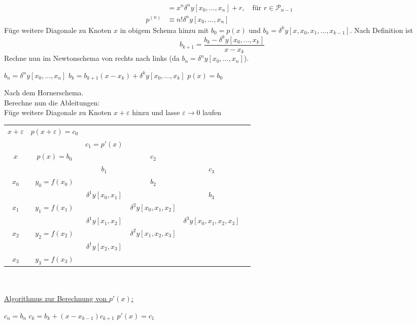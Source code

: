 \documentclass[12pt]{article}
\theoremstyle{break}
\begin{document}
\begin{description}
\begin{align*}
    &= x^n \delta^ny[x_0,..., x_n] + r, \quad \text{für }r \in \mathcal{P}_{n-1} &\\
    p^{(n)} &\equiv n! \delta^ny[x_0,..., x_n]
  \end{align*}
  Füge weitere Diagonale zu Knoten $x$ in obigem Schema hinzu mit $b_0 = p(x)$ und $b_k = \delta^k y[x, x_0, x_1, ..., x_{k-1}]$. Nach Definition ist 
  $$b_{k+1} = \frac{b_k - \delta^ky[x_0,..., x_k]}{x-x_k}$$
  Rechne nun im Newtonschema von rechts nach links (da $b_n = \delta^ny[x_0,..., x_n]$).
  \begin{algorithmic}
  \STATE $b_n = \delta^ny[x_0,...,x_n]$ 
    \STATE $b_k = b_{k+1} (x-x_k) + \delta^ky[x_0,...,x_k]$
  \ENDFOR
  \STATE $p(x) = b_0$
  \end{algorithmic}
  Nach dem Hornerschema.\\
  Berechne nun die Ableitungen: \\
  Füge weitere Diagonale zu Knoten $x+ \varepsilon$ hinzu und lasse $\varepsilon \rightarrow 0$ laufen \\
  \begin{tabular}{cccccc}
    $x+ \varepsilon$ & $p(x + \varepsilon) = c_0$ \\
    && $c_1 = p'(x)$ \\
    $x$ & $p(x) = b_0$ && $c_2$\\
    &&$b_1$&&$c_3$\\
	$x_0$ & $y_0 = f(x_0)$ && $b_2$&\rotatebox[origin=c]{90}{$=$}\\
	 & & $\delta^1y[x_0, x_1]$&& $b_3$\\
	$x_1$ & $y_1 = f(x_1)$ & &$\delta^2y[x_0, x_1, x_2]$  &\rotatebox[origin=c]{90}{$=$}\\
	 & & $\delta^1y[x_1, x_2]$ & & $\delta^3y[x_0, x_1, x_2, x_3]$\\
	$x_2$ & $y_2 = f(x_2)$ & & $\delta^2y[x_1, x_2, x_3]$\\
	 & & $\delta^1y[x_2, x_3]$\\
	$x_3$ & $y_3 = f(x_3)$ \\
  \end{tabular}\\\\
  \underline{Algorithmus zur Berechnung von $p'(x)$:}
  \begin{algorithmic}
  \STATE $c_n = b_n$
  	\STATE $c_k = b_k + (x-x_{k-1})c_{k+1}$
  \ENDFOR
  \STATE $p'(x) = c_1$
  \end{algorithmic}
\end{description}
\end{document}
